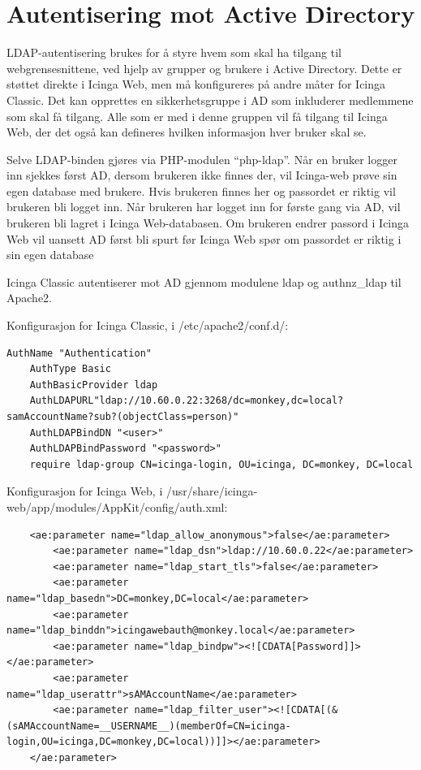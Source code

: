 \section{Autentisering mot Active Directory}\label{sec:ldapauth}
LDAP-autentisering brukes for å styre hvem som skal ha tilgang til webgrensesnittene, ved hjelp av grupper og brukere i Active Directory. Dette er støttet direkte i Icinga Web, men må konfigureres på andre måter for Icinga Classic. Det kan opprettes en sikkerhetsgruppe i AD som inkluderer medlemmene som skal få tilgang. Alle som er med i denne gruppen vil få tilgang til Icinga Web, der det også kan defineres hvilken informasjon hver bruker skal se. 

Selve LDAP-binden gjøres via PHP-modulen ``php-ldap''. Når en bruker logger inn sjekkes først AD, dersom brukeren ikke finnes der, vil Icinga-web prøve sin egen database med brukere. Hvis brukeren finnes her og passordet er riktig vil brukeren bli logget inn. Når brukeren har logget inn for første gang via AD, vil brukeren bli lagret i Icinga Web-databasen. Om brukeren endrer passord i Icinga Web vil uansett AD først bli spurt før Icinga Web spør om passordet er riktig i sin egen database

Icinga Classic autentiserer mot AD gjennom modulene ldap og authnz\_ldap til Apache2.

Konfigurasjon for Icinga Classic, i /etc/apache2/conf.d/:
\begin{lstlisting}[style=example]
    AuthName "Authentication"
    AuthType Basic
    AuthBasicProvider ldap
    AuthLDAPURL"ldap://10.60.0.22:3268/dc=monkey,dc=local?samAccountName?sub?(objectClass=person)"
    AuthLDAPBindDN "<user>"
    AuthLDAPBindPassword "<password>"
    require ldap-group CN=icinga-login, OU=icinga, DC=monkey, DC=local
\end{lstlisting}

Konfigurasjon for Icinga Web, i /usr/share/icinga-web/app/modules/AppKit/config/auth.xml:
\begin{lstlisting}
    <ae:parameter name="ldap_allow_anonymous">false</ae:parameter>
        <ae:parameter name="ldap_dsn">ldap://10.60.0.22</ae:parameter>
        <ae:parameter name="ldap_start_tls">false</ae:parameter>
        <ae:parameter name="ldap_basedn">DC=monkey,DC=local</ae:parameter>
        <ae:parameter name="ldap_binddn">icingawebauth@monkey.local</ae:parameter>
        <ae:parameter name="ldap_bindpw"><![CDATA[Password]]></ae:parameter>
        <ae:parameter name="ldap_userattr">sAMAccountName</ae:parameter>
        <ae:parameter name="ldap_filter_user"><![CDATA[(&(sAMAccountName=__USERNAME__)(memberOf=CN=icinga-login,OU=icinga,DC=monkey,DC=local))]]></ae:parameter>
    </ae:parameter>
\end{lstlisting}

